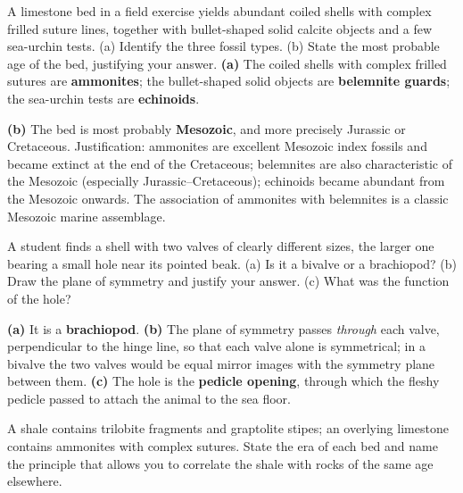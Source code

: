 \documentclass[11pt]{article}
\begin{document}
\begin{exoresolu}
A limestone bed in a field exercise yields abundant coiled shells with complex frilled suture lines, together with bullet-shaped solid calcite objects and a few sea-urchin tests. (a) Identify the three fossil types. (b) State the most probable age of the bed, justifying your answer.
\tcblower
\textbf{(a)} The coiled shells with complex frilled sutures are \textbf{ammonites}; the bullet-shaped solid objects are \textbf{belemnite guards}; the sea-urchin tests are \textbf{echinoids}. \par
\textbf{(b)} The bed is most probably \textbf{Mesozoic}, and more precisely Jurassic or Cretaceous. Justification: ammonites are excellent Mesozoic index fossils and became extinct at the end of the Cretaceous; belemnites are also characteristic of the Mesozoic (especially Jurassic--Cretaceous); echinoids became abundant from the Mesozoic onwards. The association of ammonites with belemnites is a classic Mesozoic marine assemblage.
\end{exoresolu}

\begin{exercice}
A student finds a shell with two valves of clearly different sizes, the larger one bearing a small hole near its pointed beak. (a) Is it a bivalve or a brachiopod? (b) Draw the plane of symmetry and justify your answer. (c) What was the function of the hole?
\end{exercice}

\begin{corrige}[Exercise 1]
\textbf{(a)} It is a \textbf{brachiopod}. \textbf{(b)} The plane of symmetry passes \emph{through} each valve, perpendicular to the hinge line, so that each valve alone is symmetrical; in a bivalve the two valves would be equal mirror images with the symmetry plane between them. \textbf{(c)} The hole is the \textbf{pedicle opening}, through which the fleshy pedicle passed to attach the animal to the sea floor.
\end{corrige}

\begin{exercice}
A shale contains trilobite fragments and graptolite stipes; an overlying limestone contains ammonites with complex sutures. State the era of each bed and name the principle that allows you to correlate the shale with rocks of the same age elsewhere.
\end{exercice}
\end{document}
